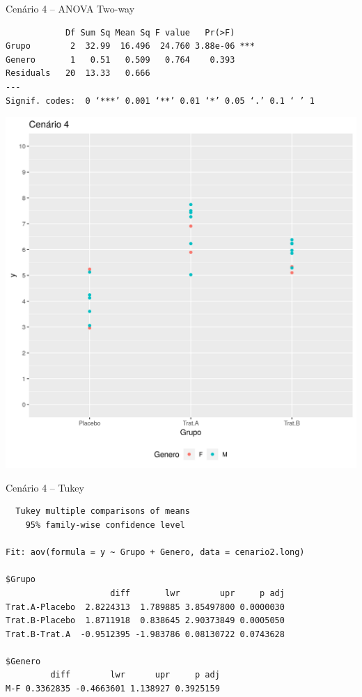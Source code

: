 \documentclass{beamer}
\begin{document}

\begin{frame}[fragile]
  \begin{exampleblock}{Cenário 4 -- ANOVA Two-way}
    \tiny
\begin{verbatim}
            Df Sum Sq Mean Sq F value   Pr(>F)
Grupo        2  32.99  16.496  24.760 3.88e-06 ***
Genero       1   0.51   0.509   0.764    0.393
Residuals   20  13.33   0.666
---
Signif. codes:  0 ‘***’ 0.001 ‘**’ 0.01 ‘*’ 0.05 ‘.’ 0.1 ‘ ’ 1
\end{verbatim}
    \begin{center}
      \includegraphics[height=.5\textheight]{Cap13-30/cenario22}
    \end{center}
  \end{exampleblock}
\end{frame}

\begin{frame}[fragile]
  \begin{exampleblock}{Cenário 4 -- Tukey}
    \tiny
\begin{verbatim}
  Tukey multiple comparisons of means
    95% family-wise confidence level

Fit: aov(formula = y ~ Grupo + Genero, data = cenario2.long)

$Grupo
                     diff       lwr        upr     p adj
Trat.A-Placebo  2.8224313  1.789885 3.85497800 0.0000030
Trat.B-Placebo  1.8711918  0.838645 2.90373849 0.0005050
Trat.B-Trat.A  -0.9512395 -1.983786 0.08130722 0.0743628

$Genero
         diff        lwr      upr     p adj
M-F 0.3362835 -0.4663601 1.138927 0.3925159
\end{verbatim}
  \end{exampleblock}
\end{frame}
\end{document}
